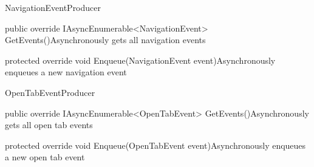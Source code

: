 \begin{class}{NavigationEventProducer} 
    


    \begin{methods}
        \begin{method}{public override IAsyncEnumerable<NavigationEvent> GetEvents()}{Asynchronously gets all navigation events}
        \end{method}
        \begin{method}{protected override void Enqueue(NavigationEvent event)}{Asynchronously enqueues a new navigation event}
            \begin{parameters}
            \end{parameters}
        \end{method}
    \end{methods}
\end{class}

\begin{class}{OpenTabEventProducer} 
    


    \begin{methods}
        \begin{method}{public override IAsyncEnumerable<OpenTabEvent> GetEvents()}{Asynchronously gets all open tab events}
        \end{method}
        \begin{method}{protected override void Enqueue(OpenTabEvent event)}{Asynchronously enqueues a new open tab event}
            \begin{parameters}
            \end{parameters}
        \end{method}
    \end{methods}
\end{class}

